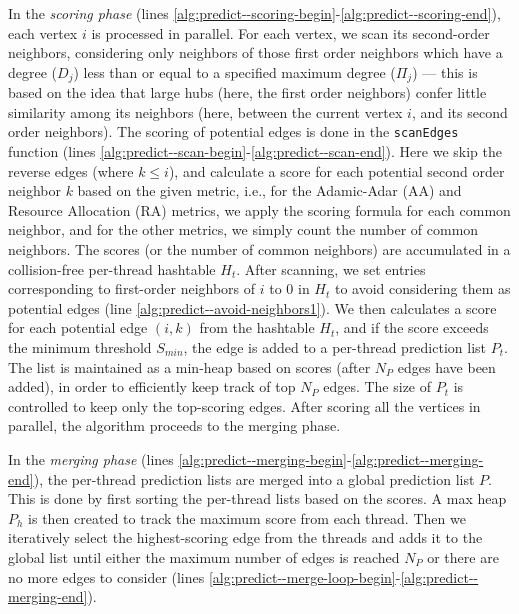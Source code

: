 In the \textit{scoring phase} (lines \ref{alg:predict--scoring-begin}-\ref{alg:predict--scoring-end}), each vertex $i$ is processed in parallel. For each vertex, we scan its second-order neighbors, considering only neighbors of those first order neighbors which have a degree ($D_j$) less than or equal to a specified maximum degree ($\Pi_j$) --- this is based on the idea that large hubs (here, the first order neighbors) confer little similarity among its neighbors (here, between the current vertex $i$, and its second order neighbors). The scoring of potential edges is done in the \texttt{scanEdges} function (lines \ref{alg:predict--scan-begin}-\ref{alg:predict--scan-end}). Here we skip the reverse edges (where $k \leq i$), and calculate a score for each potential second order neighbor $k$ based on the given metric, i.e., for the Adamic-Adar (AA) and Resource Allocation (RA) metrics, we apply the scoring formula for each common neighbor, and for the other metrics, we simply count the number of common neighbors. The scores (or the number of common neighbors) are accumulated in a collision-free per-thread hashtable $H_t$. After scanning, we set entries corresponding to first-order neighbors of $i$ to $0$ in $H_t$ to avoid considering them as potential edges (line \ref{alg:predict--avoid-neighbors1}). We then calculates a score for each potential edge $(i, k)$ from the hashtable $H_t$, and if the score exceeds the minimum threshold $S_{min}$, the edge is added to a per-thread prediction list $P_t$. The list is maintained as a min-heap based on scores (after $N_P$ edges have been added), in order to efficiently keep track of top $N_P$ edges. The size of $P_t$ is controlled to keep only the top-scoring edges. After scoring all the vertices in parallel, the algorithm proceeds to the merging phase.

In the \textit{merging phase} (lines \ref{alg:predict--merging-begin}-\ref{alg:predict--merging-end}), the per-thread prediction lists are merged into a global prediction list $P$. This is done by first sorting the per-thread lists based on the scores. A max heap $P_h$ is then created to track the maximum score from each thread. Then we iteratively select the highest-scoring edge from the threads and adds it to the global list until either the maximum number of edges is reached $N_P$ or there are no more edges to consider (lines \ref{alg:predict--merge-loop-begin}-\ref{alg:predict--merging-end}).


